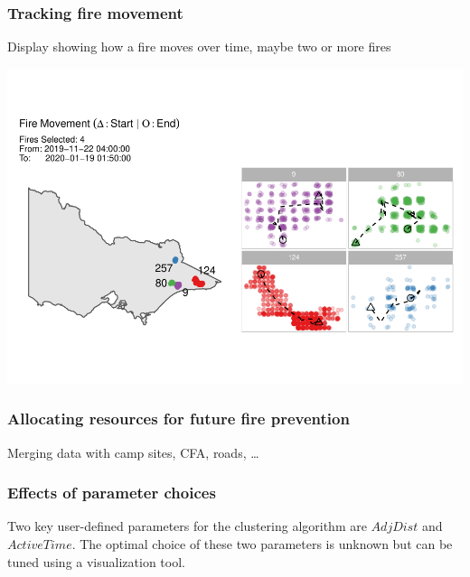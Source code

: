 \hypertarget{tracking-fire-movement}{%
\subsubsection{Tracking fire movement}\label{tracking-fire-movement}}

Display showing how a fire moves over time, maybe two or more fires

\begin{Schunk}


\begin{center}\includegraphics[width=0.8\linewidth]{clustering_paper_files/figure-latex/unnamed-chunk-12-1} \end{center}

\end{Schunk}

\hypertarget{allocating-resources-for-future-fire-prevention}{%
\subsubsection{Allocating resources for future fire
prevention}\label{allocating-resources-for-future-fire-prevention}}

Merging data with camp sites, CFA, roads, \ldots{}

\hypertarget{effects-of-parameter-choices}{%
\subsubsection{Effects of parameter
choices}\label{effects-of-parameter-choices}}

Two key user-defined parameters for the clustering algorithm are
\(AdjDist\) and \(ActiveTime\). The optimal choice of these two
parameters is unknown but can be tuned using a visualization tool.

